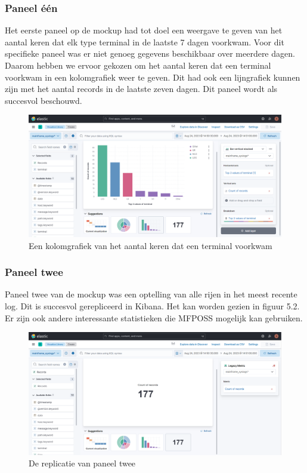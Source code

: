 \subsubsection{Paneel één}
Het eerste paneel op de mockup had tot doel een weergave te geven van het aantal keren dat elk type terminal in de laatste 7 dagen voorkwam. Voor dit specifieke paneel was er niet genoeg gegevens beschikbaar over meerdere dagen. Daarom hebben we ervoor gekozen om het aantal keren dat een terminal voorkwam in een kolomgrafiek weer te geven. Dit had ook een lijngrafiek kunnen zijn met het aantal records in de laatste zeven dagen. Dit paneel wordt als succesvol beschouwd.

\begin{figure}[h]
    \centering
    \includegraphics[width=0.50\linewidth]{bachproef//graphics/kibana_bar_chart.png}
    \caption{Een kolomgrafiek van het aantal keren dat een terminal voorkwam}
    \label{fig:Een kolomgrafiek van het aantal keren dat een terminal voorkwam}
\end{figure}

\subsubsection{Paneel twee}
Paneel twee van de mockup was een optelling van alle rijen in het meest recente log. Dit is succesvol gerepliceerd in Kibana. Het kan worden gezien in figuur 5.2. Er zijn ook andere interessante statistieken die MFPOSS mogelijk kan gebruiken.

\begin{figure}[h]
    \centering
    \includegraphics[width=0.50\linewidth]{bachproef//graphics/kibana_record_panel.png}
    \caption{De replicatie van paneel twee}
    \label{fig:De replicatie van paneel twee}
\end{figure}

